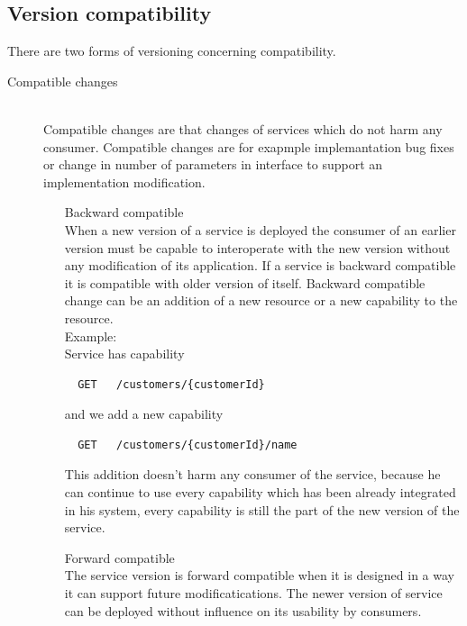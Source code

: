 \subsection{Version compatibility}
There are two forms of versioning concerning compatibility. \cite{website:service-versioning}
\begin{description}
  \item[Compatible changes] \hfill \\
  Compatible changes are that changes of services which do not harm any consumer. Compatible changes are for exapmple implemantation bug fixes or change in number of parameters in interface to support an implementation modification.
  \begin{enumerate}
    \item[Backward compatible] \hfill \\ 
  When a new version of a service is deployed the consumer of an earlier version must be capable to interoperate with the new version without any modification of its application. If a service is backward compatible it is compatible with older version of itself. Backward compatible change can be an addition of a new resource or a new capability to the resource. \hfill \\ 
  Example: \hfill \\ 
  Service has capability \hfill \\ 
  \begin{lstlisting}
  GET   /customers/{customerId}
  \end{lstlisting}
  and we add a new capability 
  \begin{lstlisting}
  GET   /customers/{customerId}/name
  \end{lstlisting}

  This addition doesn't harm any consumer of the service, because he can continue to use every capability which has been already integrated in his system, every capability is still the part of the new version of the service. 
  \item[Forward compatible] \hfill \\
  The service version is forward compatible when it is designed in a way it can support future modificatications. The newer version of service can be deployed without influence on its usability by consumers. 
  \end{enumerate}
  

\end{description}
